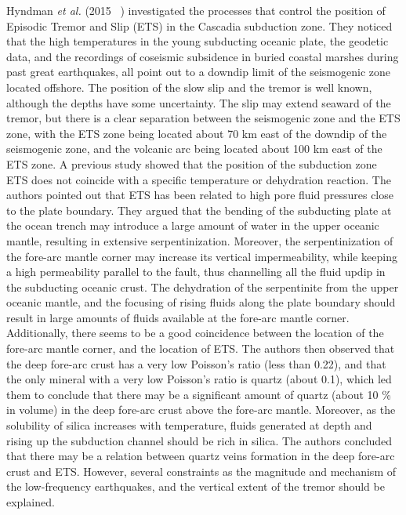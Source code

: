 \documentclass[main.tex]{subfiles}
\begin{document}
Hyndman \textit{et al.} (2015 ~\cite{HYN_2015}) investigated the processes that control the position of Episodic Tremor and Slip (ETS) in the Cascadia subduction zone. They noticed that the high temperatures in the young subducting oceanic plate, the geodetic data, and the recordings of coseismic subsidence in buried coastal marshes during past great earthquakes, all point out to a downdip limit of the seismogenic zone located offshore. The position of the slow slip and the tremor is well known, although the depths have some uncertainty. The slip may extend seaward of the tremor, but there is a clear separation between the seismogenic zone and the ETS zone, with the ETS zone being located about 70 km east of the downdip of the seismogenic zone, and the volcanic arc being located about 100 km east of the ETS zone. A previous study showed that the position of the subduction zone ETS does not coincide with a specific temperature or dehydration reaction. The authors pointed out that ETS has been related to high pore fluid pressures close to the plate boundary. They argued that the bending of the subducting plate at the ocean trench may introduce a large amount of water in the upper oceanic mantle, resulting in extensive serpentinization. Moreover, the serpentinization of the fore-arc mantle corner may increase its vertical impermeability, while keeping a high permeability parallel to the fault, thus channelling all the fluid updip in the subducting oceanic crust. The dehydration of the serpentinite from the upper oceanic mantle, and the focusing of rising fluids along the plate boundary should result in large amounts of fluids available at the fore-arc mantle corner. Additionally, there seems to be a good coincidence between the location of the fore-arc mantle corner, and the location of ETS. The authors then observed that the deep fore-arc crust has a very low Poisson's ratio (less than 0.22), and that the only mineral with a very low Poisson's ratio is quartz (about 0.1), which led them to conclude that there may be a significant amount of quartz (about 10 \% in volume) in the deep fore-arc crust above the fore-arc mantle. Moreover, as the solubility of silica increases with temperature, fluids generated at depth and rising up the subduction channel should be rich in silica. The authors concluded that there may be a relation between quartz veins formation in the deep fore-arc crust and ETS. However, several constraints as the magnitude and mechanism of the low-frequency earthquakes, and the vertical extent of the tremor should be explained. \\
\end{document}
